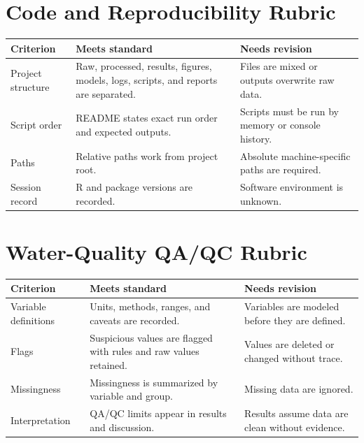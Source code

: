 \section{Code and Reproducibility Rubric}
\begin{longtable}{p{}p{}p{}}
\toprule
\textbf{Criterion} & \textbf{Meets standard} & \textbf{Needs revision} \\
\midrule
Project structure & Raw, processed, results, figures, models, logs, scripts, and reports are separated. & Files are mixed or outputs overwrite raw data. \\
Script order & README states exact run order and expected outputs. & Scripts must be run by memory or console history. \\
Paths & Relative paths work from project root. & Absolute machine-specific paths are required. \\
Session record & R and package versions are recorded. & Software environment is unknown. \\
\bottomrule
\end{longtable}

\section{Water-Quality QA/QC Rubric}
\begin{longtable}{p{}p{}p{}}
\toprule
\textbf{Criterion} & \textbf{Meets standard} & \textbf{Needs revision} \\
\midrule
Variable definitions & Units, methods, ranges, and caveats are recorded. & Variables are modeled before they are defined. \\
Flags & Suspicious values are flagged with rules and raw values retained. & Values are deleted or changed without trace. \\
Missingness & Missingness is summarized by variable and group. & Missing data are ignored. \\
Interpretation & QA/QC limits appear in results and discussion. & Results assume data are clean without evidence. \\
\bottomrule
\end{longtable}

